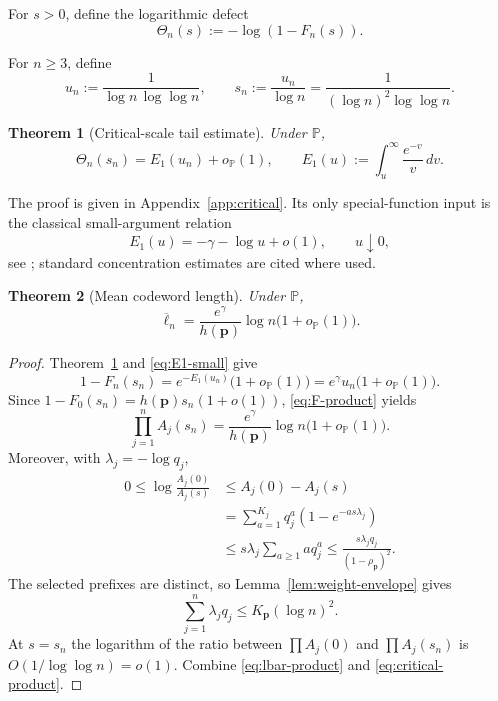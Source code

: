 \documentclass[journal]{IEEEtran}
\theoremstyle{plain}
\newtheorem{theorem}{Theorem}[section]
\theoremstyle{definition}
\theoremstyle{remark}
\newcommand{\Pideal}{\mathbb P}
\newcommand{\hp}{h(\mathbf p)}
\newcommand{\rhoP}{\rho_{\mathbf p}}
\newcommand{\lbar}{\overline\ell}
\begin{document}
For $s>0$, define the logarithmic defect
\begin{equation}\label{eq:tail-def}
 \Theta_n(s):=-\log(1-F_n(s)).
\end{equation}

For $n\ge3$, define
\begin{equation}\label{eq:critical-sequences}
 u_n:=\frac1{\log n\,\log\log n},
 \qquad
 s_n:=\frac{u_n}{\log n}
 =\frac1{(\log n)^2\log\log n}.
\end{equation}

\begin{theorem}[Critical-scale tail estimate]\label{thm:critical}
Under $\Pideal$,
\begin{equation}\label{eq:critical}
 \Theta_n(s_n)=E_1(u_n)+o_{\Pideal}(1),
 \qquad
 E_1(u):=\int_u^\infty\frac{e^{-v}}v\,dv.
\end{equation}
\end{theorem}

The proof is given in Appendix~\ref{app:critical}.  Its only special-function input is the classical small-argument relation
\begin{equation}\label{eq:E1-small}
 E_1(u)=-\gamma-\log u+o(1),\qquad u\downarrow0,
\end{equation}
see \cite[Eq.~5.1.11]{AbramowitzStegun1972}; standard concentration estimates are cited where used.

\begin{theorem}[Mean codeword length]\label{thm:mean-length}
Under $\Pideal$,
\begin{equation}\label{eq:mean-length}
 \lbar_n=\frac{e^\gamma}{\hp}\log n\bigl(1+o_{\Pideal}(1)\bigr).
\end{equation}
\end{theorem}

\begin{proof}
Theorem~\ref{thm:critical} and \eqref{eq:E1-small} give
\begin{equation*}
 1-F_n(s_n)=e^{-E_1(u_n)}\bigl(1+o_{\Pideal}(1)\bigr)
 =e^\gamma u_n\bigl(1+o_{\Pideal}(1)\bigr).
\end{equation*}
Since $1-F_0(s_n)=\hp s_n(1+o(1))$, \eqref{eq:F-product} yields
\begin{equation}\label{eq:critical-product}
 \prod_{j=1}^nA_j(s_n)
 =\frac{e^\gamma}{\hp}\log n\bigl(1+o_{\Pideal}(1)\bigr).
\end{equation}
Moreover, with $\lambda_j=-\log q_j$,
\begin{align*}
 0\le \log\frac{A_j(0)}{A_j(s)}
 &\le A_j(0)-A_j(s)\\
 &=\sum_{a=1}^{K_j}q_j^a(1-e^{-as\lambda_j})\\
 &\le s\lambda_j\sum_{a\ge1}a q_j^a
 \le \frac{s\lambda_jq_j}{(1-\rhoP)^2}.
\end{align*}
The selected prefixes are distinct, so Lemma~\ref{lem:weight-envelope} gives
\begin{equation*}
 \sum_{j=1}^n\lambda_jq_j\le K_{\mathbf p}(\log n)^2.
\end{equation*}
At $s=s_n$ the logarithm of the ratio between $\prod A_j(0)$ and $\prod A_j(s_n)$ is $O(1/\log\log n)=o(1)$.  Combine \eqref{eq:lbar-product} and \eqref{eq:critical-product}.
\end{proof}
\end{document}
